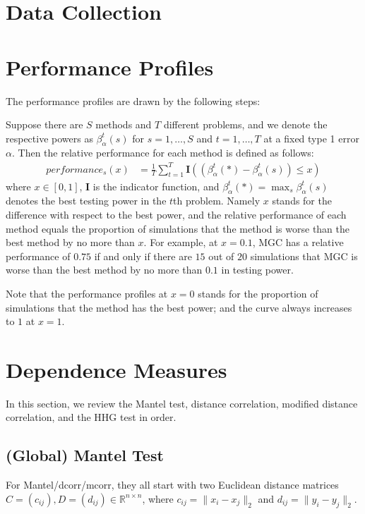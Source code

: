 \documentclass[11pt]{article}
\providecommand{\mb}[1]{\boldsymbol{#1}}
\newcommand{\Real}{\mathbb{R}}
\begin{document}
\section{Data Collection}



\section{Performance Profiles}
\label{sec:pp}
The performance profiles are drawn by the following steps:

Suppose there are $S$ methods and $T$ different problems, and we denote the respective powers as $\beta_{\alpha}^{t}(s)$ for $s=1,\ldots,S$ and $t=1,\ldots,T$ at a fixed type 1 error $\alpha$. Then the relative performance for each method is defined as follows:
\begin{align*}
performance_{s}(x) &= \frac{1}{T} \sum_{t=1}^{T} \mb{I}((\beta_{\alpha}^{t}(*)-\beta_{\alpha}^{t}(s)) \leq x)
\end{align*}
where $x \in [0,1]$, $\mb{I}$ is the indicator function, and $\beta_{\alpha}^{t}(*) =\max_{s} \beta_{\alpha}^{t}(s)$ denotes the best testing power in the $t$th problem. Namely $x$ stands for the difference with respect to the best power, and the relative performance of each method equals the proportion of simulations that the method is worse than the best method by no more than $x$. For example, at $x=0.1$, MGC has a relative performance of $0.75$ if and only if there are $15$ out of $20$ simulations that MGC is worse than the best method by no more than $0.1$ in testing power. 

Note that the performance profiles at $x=0$ stands for the proportion of simulations that the method has the best power; and the curve always increases to $1$ at $x=1$. 

\section{Dependence Measures}
\label{main}



In this section, we review the Mantel test, distance correlation, modified distance correlation, and the HHG test in order.

\subsection{(Global) Mantel Test}
\label{sec:mantel}
For Mantel/dcorr/mcorr, they all start with two Euclidean distance matrices $C=(c_{ij}), D=(d_{ij}) \in \Real^{n \times n}$, where $c_{ij}=\|x_{i}-x_{j}\|_{2}$ and $d_{ij}=\|y_{i}-y_{j}\|_{2}$. 
\end{document}
